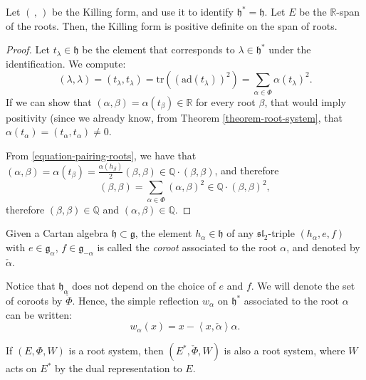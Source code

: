 \begin{lemma}
\label{lemma-Killing-positivedefinite} 
Let $(\, , \,)$ be the Killing form, and use it to identify $\mathfrak h^*=\mathfrak h$. Let $E$ be the $\mathbb R$-span of the roots. Then, the Killing form is positive definite on the span of roots.
\end{lemma}

\begin{proof}
Let $t_\lambda\in \mathfrak h$ be the element that corresponds to $\lambda\in \mathfrak h^*$ under the identification. We compute:
$$(\lambda,\lambda)=(t_\lambda,t_\lambda) = \text{tr}((\text{ad}(t_\lambda))^2) = \sum_{\alpha\in\Phi} \alpha(t_\lambda)^2.$$ 
If we can show that $(\alpha,\beta)=\alpha(t_\beta)\in \mathbb R$ for every root $\beta$, that would imply positivity (since we already know, from Theorem \ref{theorem-root-system}, that $\alpha(t_\alpha) = (t_\alpha, t_\alpha)\ne 0$.

From \eqref{equation-pairing-roots}, we have that $(\alpha,\beta) =  \alpha(t_\beta) = \frac{\alpha(h_\beta)}{2} (\beta,\beta) \in \mathbb Q\cdot (\beta,\beta)$, and therefore
$$(\beta,\beta) = \sum_{\alpha\in\Phi} (\alpha,\beta)^2 \in \mathbb Q\cdot (\beta,\beta)^2,$$
therefore $(\beta,\beta) \in \mathbb Q$ and $(\alpha,\beta)\in \mathbb Q$.
\end{proof}



\begin{definition}
 \label{definition-coroots}
Given a Cartan algebra $\mathfrak h\subset \mathfrak g$, the element $h_\alpha\in\mathfrak h$ of any $\mathfrak{sl}_2$-triple $(h_\alpha, e, f)$ with $e\in\mathfrak g_\alpha$, $f\in\mathfrak g_{-\alpha}$ is called the {\it coroot} associated to the root $\alpha$, and denoted by $\check\alpha$. 
\end{definition}

Notice that $\mathfrak h_\alpha$ does not depend on the choice of $e$ and $f$. We will denote the set of coroots by $\check\Phi$. Hence, the simple reflection $w_\alpha$ on $\mathfrak h^*$ associated to the root $\alpha$ can be written:
\begin{equation}
 \label{equation-reflection-coroot}
 w_\alpha(x) = x - \left< x, \check\alpha\right> \alpha.
\end{equation}

\begin{lemma}
 \label{lemma-dualrootsystem}
If $(E,\Phi, W)$ is a root system, then $(E^*,\check\Phi, W)$ is also a root system, where $W$ acts on $E^*$ by the dual representation to $E$.
\end{lemma}

